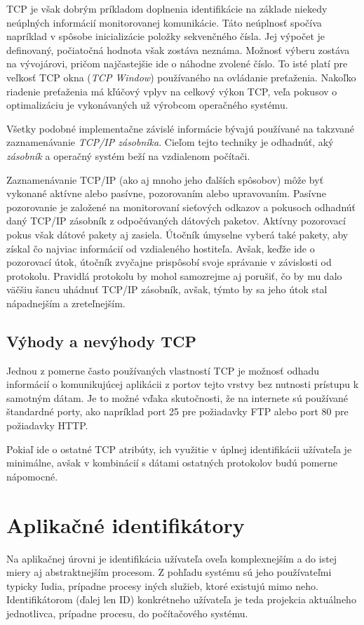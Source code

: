 \documentclass[
  digital, %
  table,   %
  lof,     %
  nolot,   %
  nocover
]{fithesis3}
\begin{document}
TCP je však dobrým príkladom doplnenia identifikácie na základe niekedy neúplných
informácií monitorovanej komunikácie. Táto neúplnosť spočíva napríklad v
spôsobe inicializácie položky sekvenčného čísla. Jej výpočet je definovaný,
počiatočná hodnota však zostáva neznáma. Možnosť výberu zostáva na vývojárovi,
pričom najčastejšie ide o náhodne zvolené číslo. To isté platí pre veľkosť TCP
okna (\textit{TCP Window}) používaného na ovládanie preťaženia. Nakoľko
riadenie preťaženia má kľúčový vplyv na celkový výkon TCP, veľa pokusov o
optimalizáciu je vykonávaných už výrobcom operačného systému.
 
Všetky podobné implementačne závislé informácie bývajú používané na takzvané
zaznamenávanie \textit{TCP/IP zásobníka}. Cieľom tejto techniky je odhadnúť,
aký \textit{zásobník} a operačný systém beží na vzdialenom počítači.

Zaznamenávanie TCP/IP (ako aj mnoho jeho ďalších spôsobov) môže byť vykonané
aktívne alebo pasívne, pozorovaním alebo upravovaním. Pasívne pozorovanie je
založené na monitorovaní sieťových odkazov a pokusoch odhadnúť daný TCP/IP
zásobník z odpočúvaných dátových paketov. Aktívny pozorovací pokus však dátové
pakety aj zasiela. Útočník úmyselne vyberá také pakety, aby získal čo najviac
informácií od vzdialeného hostiteľa. Avšak, keďže ide o pozorovací útok,
útočník zvyčajne prispôsobí svoje správanie v závislosti od protokolu. Pravidlá
protokolu by mohol samozrejme aj porušiť, čo by mu dalo väčšiu šancu uhádnuť
TCP/IP zásobník, avšak, týmto by sa jeho útok stal nápadnejším a zreteľnejším.
 
\subsection{Výhody a nevýhody TCP}
Jednou z pomerne často používaných vlastností TCP je možnosť odhadu informácií
o komunikujúcej aplikácii z portov tejto vrstvy bez nutnosti prístupu k samotným
dátam. Je to možné vďaka skutočnosti, že na internete sú používané štandardné
porty, ako napríklad port 25 pre požiadavky FTP alebo port 80 pre požiadavky HTTP.

Pokiaľ ide o ostatné TCP atribúty, ich využitie v úplnej identifikácii
užívateľa je minimálne, avšak v kombinácií s dátami ostatných protokolov budú
pomerne nápomocné.

\section{Aplikačné identifikátory}
Na aplikačnej úrovni je identifikácia užívateľa oveľa komplexnejším a do istej
miery aj abstraktnejším procesom. Z pohľadu systému sú jeho používateľmi
typicky ľudia, prípadne procesy iných služieb, ktoré existujú mimo neho.
Identifikátorom (ďalej len ID) konkrétneho užívateľa je teda projekcia aktuálneho
jednotlivca, prípadne procesu, do počítačového systému.
\end{document}
